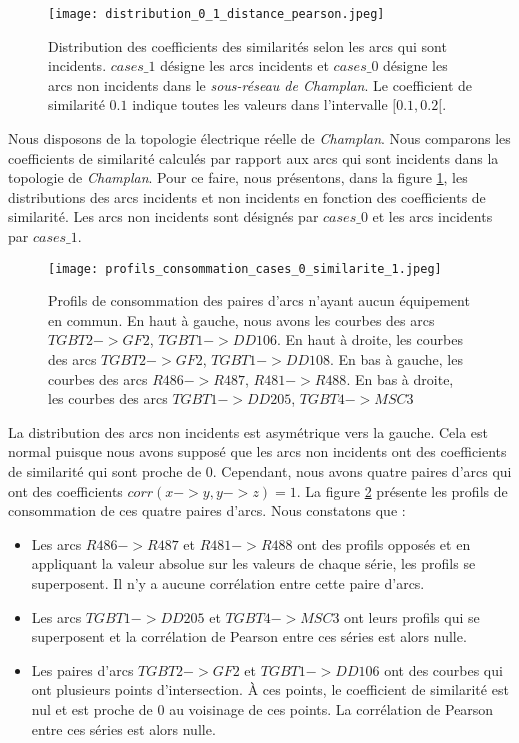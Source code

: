 \begin{figure}[htb!] 
\centering
\texttt{[image: distribution\_0\_1\_distance\_pearson.jpeg]}
\caption{Distribution des coefficients des similarit\'es selon les arcs qui sont incidents.
$cases\_1$ d\'esigne les arcs incidents et $cases\_0$ d\'esigne les arcs non incidents dans le {\em sous-r\'eseau de Champlan}.
Le coefficient de similarit\'e $0.1$ indique toutes les valeurs dans l'intervalle $[0.1, 0.2[$.
}
\label{distribution_0_1_distance_pearson}
\end{figure}
Nous disposons de la topologie \'electrique r\'eelle de {\em Champlan}.
Nous comparons  les coefficients de similarit\'e  calcul\'es par rapport aux arcs qui sont incidents dans la topologie de {\em Champlan}.
Pour ce faire, nous pr\'esentons, dans la figure \ref{distribution_0_1_distance_pearson}, les distributions des arcs incidents et non incidents  en fonction des coefficients de similarit\'e. Les arcs non incidents sont d\'esign\'es par $cases\_0$ et les arcs incidents par $cases\_1$.
		\begin{figure}[htb!] 
		\centering
		\texttt{[image: profils\_consommation\_cases\_0\_similarite\_1.jpeg]}
		\caption{ Profils de consommation des paires d'arcs n'ayant aucun \'equipement en commun. 
		En haut \`a gauche, nous avons les courbes des arcs $TGBT2->GF2$, $TGBT1->DD106$. 
		En haut \`a droite, les courbes des arcs $TGBT2->GF2$, $TGBT1->DD108$. 
		En bas \`a gauche, les courbes des arcs $R486->R487$, $R481->R488$.
		En bas \`a droite,  les courbes des arcs  $TGBT1->DD205$, $TGBT4->MSC3$
		}
		\label{profils_consommation_cases_0_similarite_1}
		\end{figure}
	La distribution des arcs non incidents est asym\'etrique vers la gauche. Cela est normal puisque nous avons suppos\'e que les arcs non incidents ont des coefficients de similarit\'e qui sont proche de $0$. 
	Cependant, nous avons quatre paires d'arcs qui ont des coefficients $corr(x->y,y->z) = 1$. La figure \ref{profils_consommation_cases_0_similarite_1} pr\'esente les profils de consommation de ces quatre paires d'arcs. Nous constatons que :
	\begin{itemize}
		\item Les arcs $R486->R487$ et $R481->R488$ ont des profils oppos\'es et en appliquant la valeur absolue sur les valeurs de chaque s\'erie, les profils se superposent. Il n'y a aucune corr\'elation entre cette paire d'arcs. 
		\item Les arcs $TGBT1->DD205$ et $TGBT4->MSC3$ ont leurs profils qui se superposent et la corr\'elation de Pearson entre ces s\'eries est alors nulle.
		\item Les paires d'arcs $TGBT2->GF2$ et $TGBT1->DD106$ ont des courbes qui ont plusieurs points d'intersection. \`A ces points, le coefficient de similarit\'e est nul et est proche de $0$ au voisinage de ces points. La corr\'elation de Pearson entre ces s\'eries est alors nulle. 
	\end{itemize}
